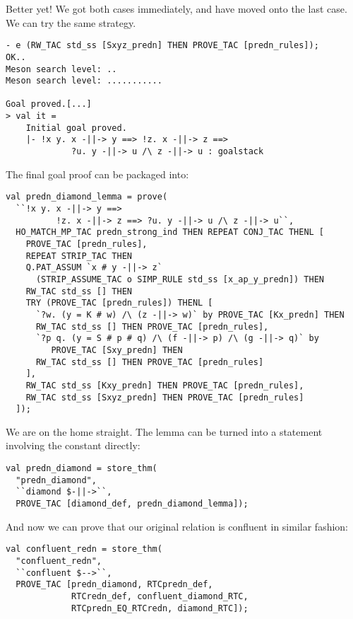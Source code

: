 Better yet! We got both cases immediately, and have moved onto the
last case.  We can try the same strategy.
\begin{session}
\begin{verbatim}
- e (RW_TAC std_ss [Sxyz_predn] THEN PROVE_TAC [predn_rules]);
OK..
Meson search level: ..
Meson search level: ...........

Goal proved.[...]
> val it =
    Initial goal proved.
    |- !x y. x -||-> y ==> !z. x -||-> z ==>
             ?u. y -||-> u /\ z -||-> u : goalstack
\end{verbatim}
\end{session}
The final goal proof can be packaged into:
\begin{session}
\begin{verbatim}
val predn_diamond_lemma = prove(
  ``!x y. x -||-> y ==>
          !z. x -||-> z ==> ?u. y -||-> u /\ z -||-> u``,
  HO_MATCH_MP_TAC predn_strong_ind THEN REPEAT CONJ_TAC THENL [
    PROVE_TAC [predn_rules],
    REPEAT STRIP_TAC THEN
    Q.PAT_ASSUM `x # y -||-> z`
      (STRIP_ASSUME_TAC o SIMP_RULE std_ss [x_ap_y_predn]) THEN
    RW_TAC std_ss [] THEN
    TRY (PROVE_TAC [predn_rules]) THENL [
      `?w. (y = K # w) /\ (z -||-> w)` by PROVE_TAC [Kx_predn] THEN
      RW_TAC std_ss [] THEN PROVE_TAC [predn_rules],
      `?p q. (y = S # p # q) /\ (f -||-> p) /\ (g -||-> q)` by
         PROVE_TAC [Sxy_predn] THEN
      RW_TAC std_ss [] THEN PROVE_TAC [predn_rules]
    ],
    RW_TAC std_ss [Kxy_predn] THEN PROVE_TAC [predn_rules],
    RW_TAC std_ss [Sxyz_predn] THEN PROVE_TAC [predn_rules]
  ]);
\end{verbatim}
\end{session}
\eos{}

We are on the home straight.  The lemma can be turned into a statement
involving the  constant directly:
\begin{session}
\begin{verbatim}
val predn_diamond = store_thm(
  "predn_diamond",
  ``diamond $-||->``,
  PROVE_TAC [diamond_def, predn_diamond_lemma]);
\end{verbatim}
\end{session}

And now we can prove that our original relation is confluent in
similar fashion:

\begin{session}
\begin{verbatim}
val confluent_redn = store_thm(
  "confluent_redn",
  ``confluent $-->``,
  PROVE_TAC [predn_diamond, RTCpredn_def,
             RTCredn_def, confluent_diamond_RTC,
             RTCpredn_EQ_RTCredn, diamond_RTC]);
\end{verbatim}
\end{session}



